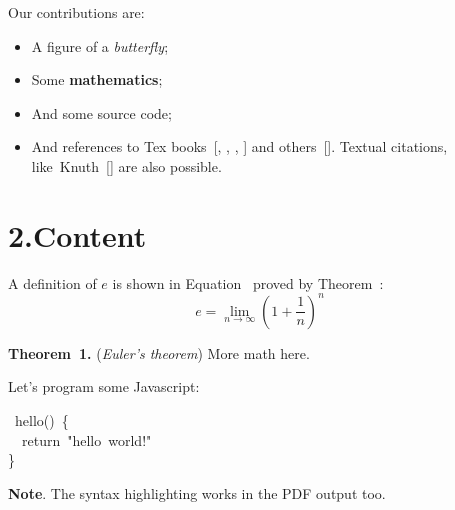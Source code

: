 \documentclass[twocolumn,10pt]{article}
\begin{document}
\noindent{}Our contributions are:%

\begin{itemize}[noitemsep,topsep=\mdcompacttopsep]%

\item{}A figure of a \emph{butterfly};%

\item{}Some \textbf{mathematics};%

\item{}And some source code;%

\item{}And references to Tex books~{}[, , , ] and others~{}[]. 
Textual citations, like~Knuth~{}[] are also possible.%
\end{itemize}%

\section{2.\hspace*{0.5em}Content}\label{sec-content}%

\noindent{}A definition of $e$ is shown in Equation~ proved by Theorem~:%
\label{euler}%
\noindent{}
\noindent\[%
e = \lim_{n\to\infty} \left( 1 + \frac{1}{n} \right)^n
\]%

\begin{mdbmarginx}{1ex}{0pt}{1ex}{0pt}%
\noindent{}\textbf{Theorem~1.} ({\itshape Euler's theorem})\mdbr
{}More math here.%
\label{th-euler}%
\end{mdbmarginx}%

\noindent{}Let's program some Javascript:%
\begin{mdpre}%
~hello()~\{\\
~~{return}~{"}{hello~world!}{"}\\
\}%
\end{mdpre}
\noindent{}\textbf{Note}.
The syntax highlighting works in the PDF output too.%
\end{document}
